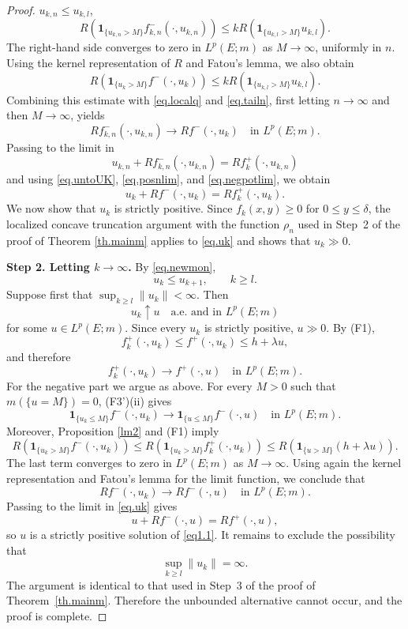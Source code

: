 \documentclass[11pt,a4paper,reqno]{amsart}
\theoremstyle{definition}
\numberwithin{equation}{section}
\begin{document}
\begin{proof}
$u_{k,n}\le u_{k,l}$,
\begin{equation}
\label{eq.tailn}
R\left(
\mathbf1_{\{u_{k,n}>M\}}f_{k,n}^-(\cdot,u_{k,n})
\right)
\le
kR\left(
\mathbf1_{\{u_{k,l}>M\}}u_{k,l}
\right).
\end{equation}
The right-hand side converges to zero in $L^p(E;m)$ as
$M\to\infty$, uniformly in $n$.
Using the kernel representation of $R$ and Fatou's lemma, we also
obtain
\[
R\left(
\mathbf1_{\{u_k>M\}}f^-(\cdot,u_k)
\right)
\le
kR\left(
\mathbf1_{\{u_{k,l}>M\}}u_{k,l}
\right).
\]
Combining this estimate with \eqref{eq.localq} and
\eqref{eq.tailn}, first letting $n\to\infty$ and then
$M\to\infty$, yields
\begin{equation}
\label{eq.negpotlim}
Rf_{k,n}^-(\cdot,u_{k,n})
\longrightarrow
Rf^-(\cdot,u_k)
\quad\text{in }L^p(E;m).
\end{equation}
Passing to the limit in
\[
u_{k,n}+Rf_{k,n}^-(\cdot,u_{k,n})
=
Rf_k^+(\cdot,u_{k,n})
\]
and using \eqref{eq.untoUK}, \eqref{eq.posnlim}, and
\eqref{eq.negpotlim}, we obtain
\begin{equation}
\label{eq.uk}
u_k+Rf^-(\cdot,u_k)=Rf_k^+(\cdot,u_k).
\end{equation}
We now show that $u_k$ is strictly positive. Since
$f_k(x,y)\ge0$ for $0\le y\le\delta$, the localized concave
truncation argument with the function $\rho_n$ used in Step~2 of the proof of
Theorem \ref{th.mainm} 
applies to \eqref{eq.uk} and shows that $u_k\gg0$.


{\bf Step 2. Letting $k\to\infty$.}  By \eqref{eq.newmon},
\[
u_k\le u_{k+1},
\qquad k\ge l.
\]
Suppose first that $\sup_{k\ge l}\|u_k\|<\infty$. Then
\[
u_k\uparrow u
\quad\text{a.e. and in }L^p(E;m)
\]
for some $u\in L^p(E;m)$. Since every $u_k$ is strictly positive,
$u\gg0$. By \textup{(F1)},
\[
f_k^+(\cdot,u_k)\le f^+(\cdot,u_k)\le h+\lambda u,
\]
and therefore
\[
f_k^+(\cdot,u_k)\longrightarrow f^+(\cdot,u)\quad\text{in }L^p(E;m).
\]
For the negative part we argue as above. For every $M>0$ such that
$m(\{u=M\})=0$, \textup{(F3')(ii)} gives
\[
\mathbf1_{\{u_k\le M\}}f^-(\cdot,u_k)\longrightarrow\mathbf1_{\{u\le M\}}f^-(\cdot,u)\quad\text{in }L^p(E;m).
\]
Moreover, Proposition \ref{lm2} and \textup{(F1)} imply
\[
R\left(\mathbf1_{\{u_k>M\}}f^-(\cdot,u_k)\right)\le 
R\left(\mathbf1_{\{u_k>M\}}f_k^+(\cdot,u_k)\right)\le R\left(\mathbf1_{\{u>M\}}(h+\lambda u)\right).
\]
The last term converges to zero in $L^p(E;m)$ as $M\to\infty$.
Using again the kernel representation and Fatou's lemma for the
limit function, we conclude that
\[
Rf^-(\cdot,u_k)\longrightarrow Rf^-(\cdot,u) \quad\text{in }L^p(E;m).
\]
Passing to the limit in \eqref{eq.uk} gives
\[
u+Rf^-(\cdot,u)=Rf^+(\cdot,u),
\]
so $u$ is a strictly positive solution of \eqref{eq1.1}.
It remains to exclude the possibility that
\[
\sup_{k\ge l}\|u_k\|=\infty.
\]
The argument is identical to that used in Step~3 of the proof of
Theorem~\ref{th.mainm}. Therefore the unbounded alternative cannot occur,
and the proof is complete.
\end{proof}
\end{document}

